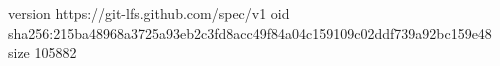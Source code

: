 version https://git-lfs.github.com/spec/v1
oid sha256:215ba48968a3725a93eb2c3fd8acc49f84a04c159109c02ddf739a92bc159e48
size 105882
